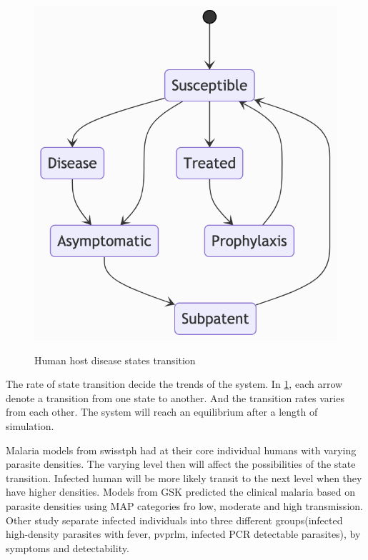 \documentclass[a4paper, 12pt, twoside]{article}
\begin{document}
\begin{figure}[t]
	\centering
	\includegraphics[keepaspectratio=true, scale=0.8]{images/disease-state-transition-diagram.png}
	\label{fig:human_state}
	\caption{Human host disease states transition}
\end{figure}

The rate of state transition decide the trends of the system.
In \ref{fig:human_state}, each arrow denote a transition from one state to another.
And the transition rates varies from each other.
The system will reach an equilibrium after a length of simulation.

Malaria models from \gls{swisstph} had at their core individual humans with varying parasite densities. The varying level then will affect the possibilities of the state transition. Infected human will be more likely transit to the next level when they have higher densities.
Models from GSK predicted the clinical malaria based on parasite densities using MAP categories fro low, moderate and high transmission.\cite{Hay2004}
Other study separate infected individuals into three different groups(infected high-density parasites with fever, \gls{pvprlm}, infected PCR detectable parasites)\cite{White2018b}, by symptoms and detectability.
\end{document}
